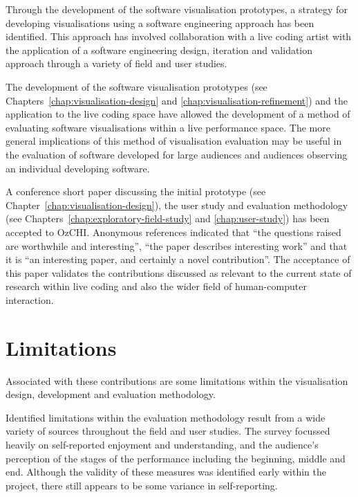 
Through the development of the software visualisation prototypes, a strategy for developing visualisations using a software engineering approach has been identified. This approach has involved collaboration with a live coding artist with the application of a software engineering design, iteration and validation approach through a variety of field and user studies.

The development of the software visualisation prototypes (see Chapters~\ref{chap:visualisation-design} and \ref{chap:visualisation-refinement}) and the application to the live coding space have allowed the development of a method of evaluating software visualisations within a live performance space. The more general implications of this method of visualisation evaluation may be useful in the evaluation of software developed for large audiences and audiences observing an individual developing software.

A conference short paper discussing the initial prototype (see Chapter~\ref{chap:visualisation-design}), the user study and evaluation methodology (see Chapters~\ref{chap:exploratory-field-study} and \ref{chap:user-study}) has been accepted to OzCHI. Anonymous references indicated that ``the questions raised are worthwhile and interesting'', ``the paper describes interesting work'' and that it is ``an interesting paper, and certainly a novel contribution''. The acceptance of this paper validates the contributions discussed as relevant to the current state of research within live coding and also the wider field of human-computer interaction.

\section{Limitations}

Associated with these contributions are some limitations within the visualisation design, development and evaluation methodology.

Identified limitations within the evaluation methodology result from a wide variety of sources throughout the field and user studies. The survey focussed heavily on self-reported enjoyment and understanding, and the audience's perception of the stages of the performance including the beginning, middle and end. Although the validity of these measures was identified early within the project, there still appears to be some variance in self-reporting.

